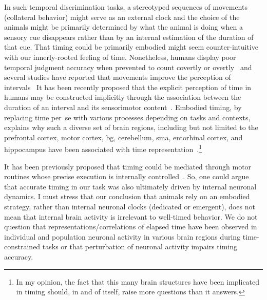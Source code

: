 In such temporal discrimination tasks, a stereotyped sequences of movements (collateral behavior) might serve as an external clock and the choice of the animals might be primarily determined by what the animal is doing when a sensory cue disappears rather than by an internal estimation of the duration of that cue.
That timing could be primarily embodied might seem counter-intuitive with our innerly-rooted feeling of time.
Nonetheless, humans display poor temporal judgment accuracy when prevented to count covertly or overtly~\cite{Rattat2012} and several studies have reported that movements improve the perception of intervals~\cite{Su2012,Manning2013,Wiener2019eNeuro}
It has been recently proposed that the explicit perception of time in humans may be constructed implicitly through the association between the duration of an interval and its sensorimotor content~\cite{Coull2018}.
Embodied timing, by replacing time per~se with various processes depending on tasks and contexts, explains why such a diverse set of brain regions, including but not limited to the prefrontal cortex, motor cortex, \gls{bg}, cerebellum, \gls{sma}, entorhinal cortex, and hippocampus have been associated with time representation~\cite{Pouthas2005, Kraus2013Neuron, Bakhurin2017JNeuro, Morillon2017PNAS, Gu2018NeuroLearnMem, Mello2015, Schubotz2000, Heys2018NN,JazayeriNN2018}.\footnote{In my opinion, the fact that this many brain structures have been implicated in timing should, in and of itself, raise more questions than it answers.}
\par
It has been previously proposed that timing could be mediated through motor routines whose precise execution is internally controlled~\cite{Killeen1988,Dragoi2003, Staddon1999}.
So, one could argue that accurate timing in our task was also ultimately driven by internal neuronal dynamics.
I must stress that our conclusion that animals rely on an embodied strategy, rather than internal neuronal clocks (dedicated or emergent), does not mean that internal brain activity is irrelevant to well-timed behavior.
We do not question that representations/correlations of elapsed time have been observed in individual and population neuronal activity in various brain regions during time-constrained tasks or that perturbation of neuronal activity impairs timing accuracy.
